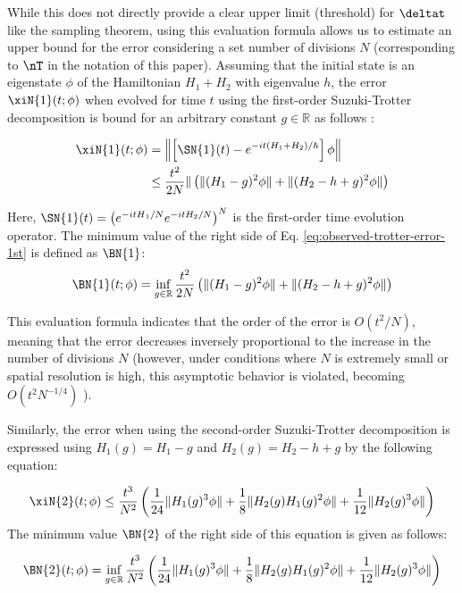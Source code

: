 \documentclass[manuscript_main.tex]{subfiles}
\begin{document}
While this does not directly provide a clear upper limit (threshold) for
$\deltat$ like the sampling theorem, using this evaluation formula allows us to
estimate an upper bound for the error considering a set number of divisions $N$
(corresponding to $\nT$ in the notation of this paper). Assuming that the initial
state is an eigenstate $\phi$ of the Hamiltonian $H_1+H_2$ with eigenvalue $h$,
the error $\xiN{1}(t;\phi)$ when evolved for time $t$ using the first-order
Suzuki-Trotter decomposition is bound for an arbitrary constant
$g\in\mathbb{R}$ as follows \cite{Burgarth2024.PhysRevResearch.6.043155}:

\begin{align}
    \xiN{1}(t;\phi) &= \left\|\left[\SN{1}(t)-e^{-it(H_1+H_2)/\hbar}\right]\phi\right\| \\
    &\leq \frac{t^2}{2N}\| \left(\|(H_1-g)^2\phi\|+\|(H_2-h+g)^2\phi\|\right)
    \label{eq:observed-trotter-error-1st}
\end{align}

Here, $\SN{1}(t) = \left(e^{-i{tH}_1/N}e^{-itH_2/N}\right)^N$ is the first-order
time evolution operator. The minimum value of the right side of Eq.
\eqref{eq:observed-trotter-error-1st} is defined as $\BN{1}$:
\begin{equation}
\BN{1}(t;\phi)=\inf_{g\in\mathbb{R}}\frac{t^2}{2N}
    \left(\|(H_1-g)^2\phi\|+\|(H_2-h+g)^2\phi\|\right)
\label{eq:observed-trotter-error-bound-1st}
\end{equation}

This evaluation formula indicates that the order of the error is $O(t^2/N)$,
meaning that the error decreases inversely proportional to the increase in the
number of divisions $N$ (however, under conditions where $N$ is extremely small
or spatial resolution is high, this asymptotic behavior is violated, becoming
$O(t^2 N^{-1/4})$ \cite{Burgarth2024.PhysRevResearch.6.043155}).

Similarly, the error when using the second-order Suzuki-Trotter decomposition is
expressed using $H_1(g) = H_1-g$ and $H_2(g) = H_2-h+g$ by the following equation:

\begin{widetext}
\begin{equation}
  \xiN{2}(t;\phi)\leq\frac{t^3}{N^2}\left(\frac{1}{24}\|H_1(g)^3\phi\| + \frac{1}{8}\|H_2(g)H_1(g)^2\phi\|
  +\frac{1}{12}\|H_2(g)^3\phi\|\right)
    \label{eq:observed-trotter-error-2nd}
\end{equation}
The minimum value $\BN{2}$ of the right side of this equation is given as follows:

\begin{equation}
\BN{2}(t;\phi)=\inf_{g\in\mathbb{R}}\frac{t^3}{N^2}
    \left(\frac{1}{24}\|H_1(g)^3\phi\| + \frac{1}{8}\|H_2(g)H_1(g)^2\phi\|
  +\frac{1}{12}\|H_2(g)^3\phi\|\right)
\label{eq:observed-trotter-error-bound-2nd}
\end{equation}
\end{widetext}
\end{document}
